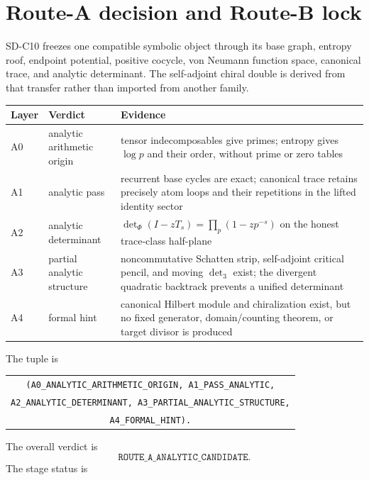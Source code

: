 \section{Route-A decision and Route-B lock}
\label{sec:route}

SD-C10 freezes one compatible symbolic object through its base graph,
entropy roof, endpoint potential, positive cocycle, von Neumann function
space, canonical trace, and analytic determinant.  The self-adjoint chiral
double is derived from that transfer rather than imported from another
family.

\begin{center}\small
\begin{tabularx}{0.99\textwidth}{L{0.08\textwidth}L{0.25\textwidth}X}
\toprule
Layer & Verdict & Evidence\\
\midrule
A0 & analytic arithmetic origin & tensor indecomposables give primes; entropy gives $\log p$ and their order, without prime or zero tables\\
A1 & analytic pass & recurrent base cycles are exact; canonical trace retains precisely atom loops and their repetitions in the lifted identity sector\\
A2 & analytic determinant & $\det_\Phi(I-zT_s)=\prod_p(1-zp^{-s})$ on the honest trace-class half-plane\\
A3 & partial analytic structure & noncommutative Schatten strip, self-adjoint critical pencil, and moving $\det_3$ exist; the divergent quadratic backtrack prevents a unified determinant\\
A4 & formal hint & canonical Hilbert module and chiralization exist, but no fixed generator, domain/counting theorem, or target divisor is produced\\
\bottomrule
\end{tabularx}
\end{center}

The tuple is
\begin{center}\small
\begin{tabular}{c}
\texttt{(A0\_ANALYTIC\_ARITHMETIC\_ORIGIN, A1\_PASS\_ANALYTIC,}\\
\texttt{A2\_ANALYTIC\_DETERMINANT, A3\_PARTIAL\_ANALYTIC\_STRUCTURE,}\\
\texttt{A4\_FORMAL\_HINT).}
\end{tabular}
\end{center}
The overall verdict is
\[
 \boxed{\texttt{ROUTE\_A\_ANALYTIC\_CANDIDATE}.}
\]
The stage status is
\begin{center}
\end{center}

